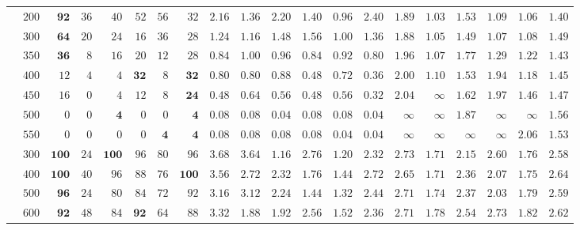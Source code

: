 \documentclass[letterpaper]{article}
\begin{document}
\begin{table}[t!]
\begin{tabular}{c|c|rrrrrr|rrrrrr|rrrrrr}
& $200$ & $\mathbf{92}$ & $36$ & $40$ & $52$ & $56$ & $32$ & $2.16$ & $1.36$ & $2.20$ & $1.40$ & $\mathbf{0.96}$ & $2.40$ & $1.89$ & $\mathbf{1.03}$ & $1.53$ & $1.09$ & $1.06$ & $1.40$ \\
& $300$ & $\mathbf{64}$ & $20$ & $24$ & $16$ & $36$ & $28$ & $1.24$ & $1.16$ & $1.48$ & $1.56$ & $\mathbf{1.00}$ & $1.36$ & $1.88$ & $\mathbf{1.05}$ & $1.49$ & $1.07$ & $1.08$ & $1.49$ \\
& $350$ & $\mathbf{36}$ & $8$ & $16$ & $20$ & $12$ & $28$ & $0.84$ & $1.00$ & $0.96$ & $0.84$ & $0.92$ & $\mathbf{0.80}$ & $1.96$ & $\mathbf{1.07}$ & $1.77$ & $1.29$ & $1.22$ & $1.43$ \\
& $400$ & $12$ & $4$ & $4$ & $\mathbf{32}$ & $8$ & $\mathbf{32}$ & $0.80$ & $0.80$ & $0.88$ & $0.48$ & $0.72$ & $\mathbf{0.36}$ & $2.00$ & $\mathbf{1.10}$ & $1.53$ & $1.94$ & $1.18$ & $1.45$ \\
& $450$ & $16$ & $0$ & $4$ & $12$ & $8$ & $\mathbf{24}$ & $0.48$ & $0.64$ & $0.56$ & $0.48$ & $0.56$ & $\mathbf{0.32}$ & $2.04$ & $\infty$ & $1.62$ & $1.97$ & $\mathbf{1.46}$ & $1.47$ \\
& $500$ & $0$ & $0$ & $\mathbf{4}$ & $0$ & $0$ & $\mathbf{4}$ & $0.08$ & $0.08$ & $\mathbf{0.04}$ & $0.08$ & $0.08$ & $\mathbf{0.04}$ & $\infty$ & $\infty$ & $1.87$ & $\infty$ & $\infty$ & $\mathbf{1.56}$ \\
& $550$ & $0$ & $0$ & $0$ & $0$ & $\mathbf{4}$ & $\mathbf{4}$ & $0.08$ & $0.08$ & $0.08$ & $0.08$ & $\mathbf{0.04}$ & $\mathbf{0.04}$ & $\infty$ & $\infty$ & $\infty$ & $\infty$ & $2.06$ & $\mathbf{1.53}$ \\
\midrule
\parbox[t]{2mm}{}
& $300$ & $\mathbf{100}$ & $24$ & $\mathbf{100}$ & $96$ & $80$ & $96$ & $3.68$ & $3.64$ & $\mathbf{1.16}$ & $2.76$ & $1.20$ & $2.32$ & $2.73$ & $\mathbf{1.71}$ & $2.15$ & $2.60$ & $1.76$ & $2.58$ \\
& $400$ & $\mathbf{100}$ & $40$ & $96$ & $88$ & $76$ & $\mathbf{100}$ & $3.56$ & $2.72$ & $2.32$ & $1.76$ & $\mathbf{1.44}$ & $2.72$ & $2.65$ & $\mathbf{1.71}$ & $2.36$ & $2.07$ & $1.75$ & $2.64$ \\
& $500$ & $\mathbf{96}$ & $24$ & $80$ & $84$ & $72$ & $92$ & $3.16$ & $3.12$ & $2.24$ & $1.44$ & $\mathbf{1.32}$ & $2.44$ & $2.71$ & $\mathbf{1.74}$ & $2.37$ & $2.03$ & $1.79$ & $2.59$ \\
& $600$ & $\mathbf{92}$ & $48$ & $84$ & $\mathbf{92}$ & $64$ & $88$ & $3.32$ & $1.88$ & $1.92$ & $2.56$ & $\mathbf{1.52}$ & $2.36$ & $2.71$ & $\mathbf{1.78}$ & $2.54$ & $2.73$ & $1.82$ & $2.62$ \\

\end{tabular}
\end{table}
\end{document}
